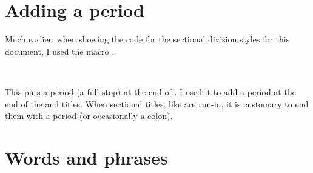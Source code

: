 \section{Adding a period}

    Much earlier, when showing the code for the sectional division styles
for this document, I used the macro \cmd{\addperiod}.

\begin{syntax}
\cmd{\addperiod} \\
\end{syntax}
This puts a period (a full stop) at the end of . I used it to
add a period at the end of the \cmd{\paragraph} and \cmd{\subparagaph} titles.
When sectional titles, like \cmd{\paragraph} are run-in, it is customary to
end them with a period (or occasionally a colon).



\section{Words and phrases}


